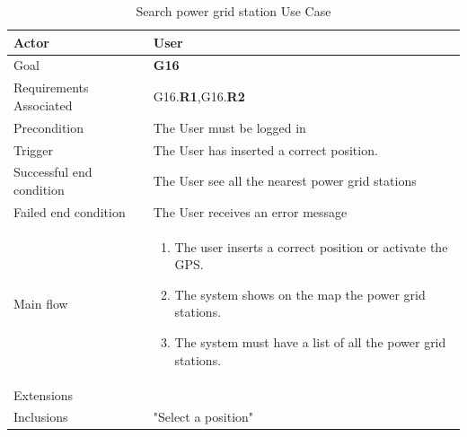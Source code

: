 \newline
\begin{table}[htb]
\begin{center}
\renewcommand{\arraystretch}{1.5}
\begin{tabular}{|l|p{}|}
\hline
Actor & User \\ \hline
Goal & \textbf{G16} \\ \hline
Requirements Associated & G16.\textbf{R1},G16.\textbf{R2} \\ \hline
Precondition & The User must be logged in \\ \hline
Trigger & The User has inserted a correct position. \\ \hline
Successful end condition & The User see all the nearest power grid stations \\ \hline
Failed end condition & The User receives an error message \\ \hline
Main flow & \begin{minipage}[t]{0.6\textwidth}
\begin{enumerate}
\addtolength{\itemindent}{0.5cm}
\item The user inserts a correct position or activate the GPS.
\item The system shows on the map the power grid stations.
\item The system must have a list of all the power grid stations.
\vspace{1,5mm}
\end{enumerate}
\end{minipage} \\ \hline
Extensions & \\ \hline
Inclusions & "Select a position" \\ \hline
\end{tabular}
\caption{Search power grid station Use Case}
\end{center}
\end{table}
\clearpage

